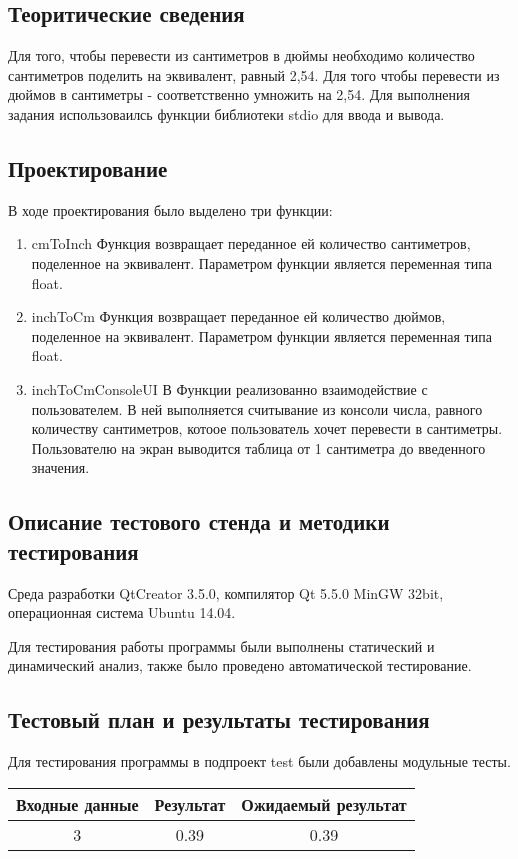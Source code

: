 \documentclass[12pt,a4paper]{report}
\begin{document}
\subsection{Теоритические сведения}
Для того, чтобы перевести из сантиметров в дюймы необходимо количество сантиметров поделить на эквивалент, равный 2,54. Для того чтобы перевести из дюймов в сантиметры - соответственно умножить на 2,54.
	Для выполнения задания использоваилсь функции библиотеки stdio для ввода и вывода.
\subsection{Проектирование}
В ходе проектирования было выделено три функции:
\begin{enumerate}
	\item cmToInch
	Функция возвращает переданное ей количество сантиметров, поделенное на эквивалент.
	Параметром функции является переменная типа float.
	\item inchToCm
	Функция возвращает переданное ей количество дюймов, поделенное на эквивалент.
	Параметром функции является переменная типа float.	
	\item inchToCmConsoleUI
	В  Функции реализованно взаимодействие с пользователем. В ней выполняется считывание из консоли числа, равного количеству сантиметров, котоое пользователь хочет перевести в сантиметры. Пользователю на экран выводится таблица от 1 сантиметра до введенного значения.	
\end{enumerate}
\subsection{Описание тестового стенда и методики тестирования}
Среда разработки QtCreator 3.5.0, компилятор Qt 5.5.0 MinGW 32bit, операционная система Ubuntu 14.04.

Для тестирования работы программы были выполнены статический и динамический анализ, также было проведено автоматической тестирование.
\subsection{Тестовый план и результаты тестирования}
Для тестирования программы в подпроект test были добавлены модульные тесты. 
 
 
 
 \begin{tabular}{|c|c|c|}
 	\hline 	
 	Входные данные & Результат & Ожидаемый  результат \\
 	\hline
	3 & 0.39 & 0.39 \\
 	\hline
 	
 \end{tabular}
\end{document}
